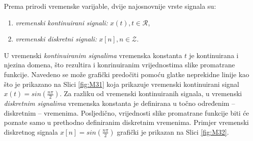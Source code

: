 \documentclass[a4paper,12pt,oneside]{memoir}
\begin{document}
            Prema prirodi vremenske varijable, dvije najosnovnije vrste signala su:
            \begin{enumerate}
                \item \textit{vremenski kontinuirani signali:} $x(t), t\in \mathcal{R}$,
                \item \textit{vremenski diskretni signali:} $x[n], n \in \mathcal{Z}$.
            \end{enumerate}

            U vremenski \textit{kontinuiranim signalima} vremenska konstanta $t$ je kontinuirana i njezina domena, što rezultira i konrinuiranim vrijednostima slike promatrane funkcije. Navedeno se može grafički predočiti pomoću glatke neprekidne linije kao što je prikazano na Slici \ref{fig:M31} koja prikazuje vremenski kontinuirani signal $x(t)=sin(\frac{n\pi}{2})$. Za razliku od vremenski kontinuiranih signala, u vremenski \textit{diskretnim signalima} vremenska konstanta je definirana u točno određenim -- diskretnim -- vremenima. Posljedično, vrijednosti slike promatrane funkcije biti će poznate samo u prethodno definiranim diskretnim vremenima. Primjer vremenski diskretnog signala $x[n]=sin(\frac{n\pi}{2})$ grafički je prikazan na Slici \ref{fig:M32}.
\end{document}
